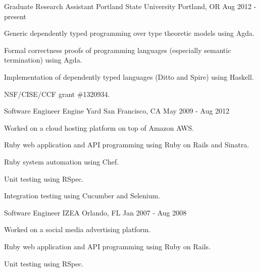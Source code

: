 

\begin{cventries}

  \cventry
    {Graduate Research Assistant} %
    {Portland State University} %
    {Portland, OR} %
    {Aug 2012 - present} %
    {
      \begin{cvitems} %
        \item {Generic dependently typed programming over type theoretic models using Agda.}
        \item {Formal correctness proofs of programming languages (especially semantic termination) using Agda.}
        \item {Implementation of dependently typed languages (Ditto and Spire) using Haskell.}
        \item {NSF/CISE/CCF grant \#1320934.}
      \end{cvitems}
    }

  \cventry
    {Software Engineer} %
    {Engine Yard} %
    {San Francisco, CA} %
    {May 2009 - Aug 2012} %
    {
      \begin{cvitems} %
        \item {Worked on a cloud hosting platform on top of Amazon AWS.}
        \item {Ruby web application and API programming using Ruby on Rails and Sinatra.}
        \item {Ruby system automation using Chef.}
        \item {Unit testing using RSpec.}
        \item {Integration testing using Cucumber and Selenium.}
      \end{cvitems}
    }

  \cventry
    {Software Engineer} %
    {IZEA} %
    {Orlando, FL} %
    {Jan 2007 - Aug 2008} %
    {
      \begin{cvitems} %
        \item {Worked on a social media advertising platform.}
        \item {Ruby web application and API programming using Ruby on Rails.}
        \item {Unit testing using RSpec.}
      \end{cvitems}
    }


\end{cventries}
